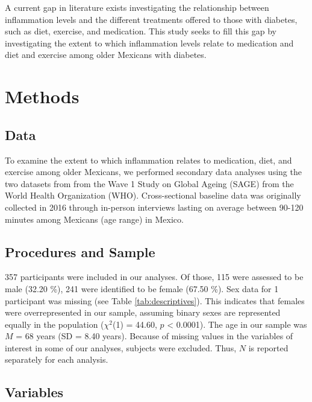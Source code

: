 \documentclass[
  man]{apa6}
\begin{document}
A current gap in literature exists investigating the relationship between inflammation levels and the different treatments offered to those with diabetes, such as diet, exercise, and medication. This study seeks to fill this gap by investigating the extent to which inflammation levels relate to medication and diet and exercise among older Mexicans with diabetes.

\hypertarget{methods}{%
\section{Methods}\label{methods}}

\hypertarget{data}{%
\subsection{Data}\label{data}}

To examine the extent to which inflammation relates to medication, diet, and exercise among older Mexicans, we performed secondary data analyses using the two datasets from from the Wave 1 Study on Global Ageing (SAGE) from the World Health Organization (WHO). Cross-sectional baseline data was originally collected in 2016 through in-person interviews lasting on average between 90-120 minutes among Mexicans (age range) in Mexico.

\hypertarget{procedures-and-sample}{%
\subsection{Procedures and Sample}\label{procedures-and-sample}}

357 participants were included in our analyses. Of those, 115 were assessed to be male (32.20 \%), 241 were identified to be female (67.50 \%). Sex data for 1 participant was missing (see Table \ref{tab:descriptives}). This indicates that females were overrepresented in our sample, assuming binary sexes are represented equally in the population (\(\chi^2\)(1) = 44.60, \(p\) \textless{} 0.0001). The age in our sample was \(M\) = 68 years (SD = 8.40 years).
Because of missing values in the variables of interest in some of our analyses, subjects were excluded. Thus, \(N\) is reported separately for each analysis.

\hypertarget{variables}{%
\subsection{Variables}\label{variables}}
\end{document}
